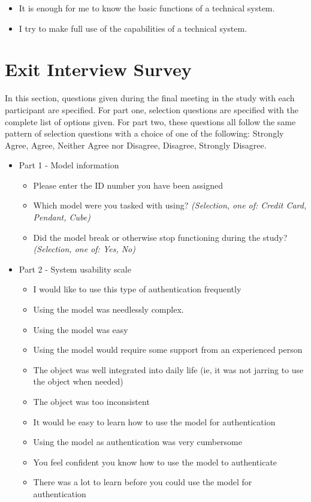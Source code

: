 \documentclass{l4proj}
\begin{document}
\begin{appendices}
\begin{itemize}
\begin{itemize}
        \item It is enough for me to know the basic functions of a technical system.
        
        \item I try to make full use of the capabilities of a technical system.
    \end{itemize}
\end{itemize}

\chapter{Exit Interview Survey}
\label{sec:interview}
In this section, questions given during the final meeting in the study with each participant are specified. For part one, selection questions are specified with the complete list of options given. For part two, these questions all follow the same pattern of selection questions with a choice of one of the following: Strongly Agree, Agree, Neither Agree nor Disagree, Disagree, Strongly Disagree.
\begin{itemize}
    \item Part 1 - Model information
    \begin{itemize}
        \item Please enter the ID number you have been assigned
        \item Which model were you tasked with using? \textit{(Selection, one of: Credit Card, Pendant, Cube)}
        \item Did the model break or otherwise stop functioning during the study? \textit{(Selection, one of: Yes, No)}
    \end{itemize}
    \item Part 2 - System usability scale
    \begin{itemize}
        \item I would like to use this type of authentication frequently
        \item Using the model was needlessly complex.
        \item Using the model was easy
        \item Using the model would require some support from an experienced person
        \item The object was well integrated into daily life (ie, it was not jarring to use the object when needed)
        \item The object was too inconsistent
        \item It would be easy to learn how to use the model for authentication
        \item Using the model as authentication was very cumbersome
        \item You feel confident you know how to use the model to authenticate
        \item There was a lot to learn before you could use the model for authentication
    \end{itemize}
\end{itemize}


\end{appendices}
\end{document}
